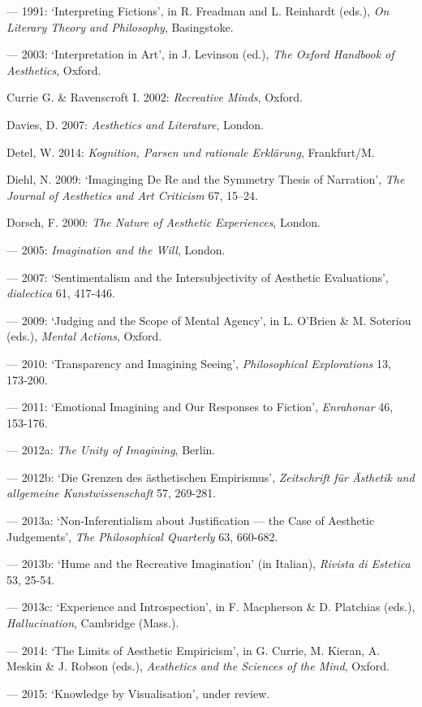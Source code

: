 \begin{hangparas}{.5cm}{1}
--- 1991: `Interpreting Fictions', in R. Freadman and L. Reinhardt (eds.), \emph{On Literary Theory and Philosophy}, Basingstoke. 

--- 2003: `Interpretation in Art', in J. Levinson (ed.), \emph{The Oxford Handbook of Aesthetics}, Oxford.

Currie G. \& Ravenscroft I. 2002: \emph{Recreative Minds}, Oxford.

Davies, D. 2007: \emph{Aesthetics and Literature}, London.

Detel, W. 2014: \emph{Kognition, Parsen und rationale Erkl\"arung}, Frankfurt/M.

Diehl, N. 2009: `Imaginging De Re and the Symmetry Thesis of Narration', \emph{The Journal of Aesthetics and Art Criticism} 67, 15--24.

Dorsch, F. 2000: \emph{The Nature of Aesthetic Experiences}, London.

--- 2005: \emph{Imagination and the Will}, London.
 
--- 2007: `Sentimentalism and the Intersubjectivity of Aesthetic Evaluations', \emph{dialectica} 61, 417-446. 
 
--- 2009: `Judging and the Scope of Mental Agency', in L. O'Brien \& M. Soteriou (eds.), \emph{Mental Actions}, Oxford. 
 
--- 2010: `Transparency and Imagining Seeing', \emph{Philosophical Explorations} 13, 173-200. 
 
--- 2011: `Emotional Imagining and Our Responses to Fiction', \emph{Enrahonar} 46, 153-176. 
 
--- 2012a: \emph{The Unity of Imagining}, Berlin.

--- 2012b: `Die Grenzen des \"asthetischen Empirismus', \emph{Zeitschrift f\"ur \"Asthetik und allgemeine Kunstwissenschaft} 57, 269-281.
 
--- 2013a: `Non-Inferentialism about Justification --- the Case of Aesthetic Judgements', \emph{The Philosophical Quarterly} 63, 660-682.

--- 2013b: `Hume and the Recreative Imagination' (in Italian), \emph{Rivista di Estetica} 53, 25-54. 

--- 2013c: `Experience and Introspection', in F. Macpherson \& D. Platchias (eds.), \emph{Hallucination}, Cambridge (Mass.). 

--- 2014: `The Limits of Aesthetic Empiricism', in G. Currie, M. Kieran, A. Meskin \& J. Robson (eds.), \emph{Aesthetics and the Sciences of the Mind}, Oxford. 

--- 2015: `Knowledge by Visualisation', under review.


\end{hangparas}
